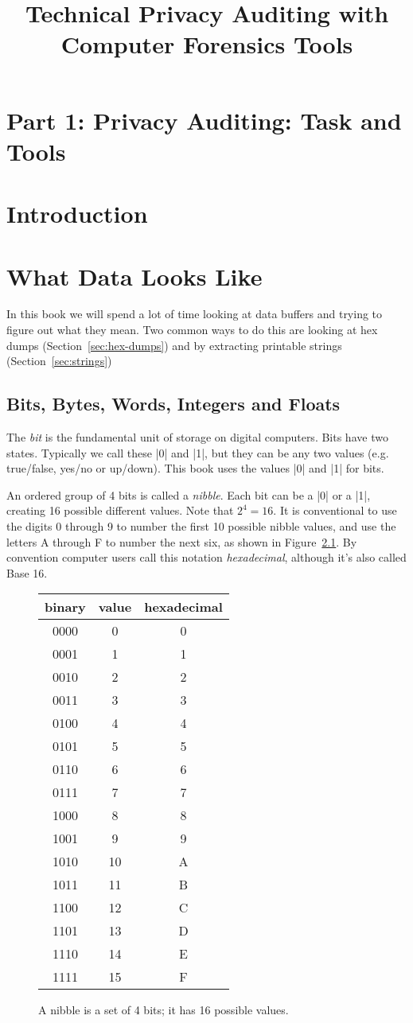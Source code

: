 \documentclass[11pt,letter]{book}
\newcommand{\figref}[1]{Figure~\ref{#1}\xspace}
\newcommand{\secref}[1]{Section~\ref{#1}\xspace}
\begin{document}
\title{Technical Privacy Auditing with Computer Forensics Tools}
\chapter*{Part 1: Privacy Auditing: Task and Tools}
\chapter{Introduction}
\chapter{What Data Looks Like}

In this book we will spend a lot of time looking at data buffers and
trying to figure out what they mean. Two common ways to do this are
looking at hex dumps (\secref{sec:hex-dumps}) and by extracting
printable strings (\secref{sec:strings})

\section{Bits, Bytes, Words, Integers and Floats}
The \emph{bit} is the fundamental unit of storage on digital computers. Bits
have two states. Typically we call these |0| and |1|, but they can be any
two values (e.g. true/false, yes/no or up/down). This book 
uses the values |0| and |1| for bits.

An ordered group of 4 bits is called a \emph{nibble}. Each bit can be
a |0| or a |1|, creating 16 possible different values. Note
that $2^4=16$. It is conventional to use the digits 0 through 9 to
number the first 10 possible nibble values, and use the letters A
through F to number the next six, as shown in \figref{nibble}. By
convention computer users call this notation \emph{hexadecimal},
although it's also called Base 16.

\begin{figure}
\begin{tabular}{ccc}
binary & value & hexadecimal\\
\hline
0000 & 0 & 0 \\
0001 & 1 & 1 \\
0010 & 2 & 2 \\
0011 & 3 & 3 \\
0100 & 4 & 4 \\
0101 & 5 & 5 \\
0110 & 6 & 6 \\
0111 & 7 & 7 \\
1000 & 8 & 8 \\
1001 & 9 & 9 \\
1010 & 10& A \\
1011 & 11& B \\
1100 & 12& C \\
1101 & 13& D \\
1110 & 14& E \\
1111 & 15& F \\
\hline
\end{tabular}
\caption{A nibble is a set of 4 bits; it has 16 possible values.}\label{nibble}
\end{figure}
\end{document}
